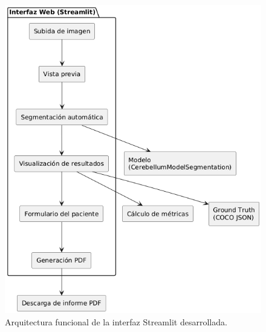 \begin{figure}[h]
    \centering
    \includegraphics[width=
    \textwidth]{img/diagrama2.png}
    \caption{Arquitectura funcional de la interfaz Streamlit desarrollada.}
    \label{fig: diagrama_interfaz}
\end{figure}
